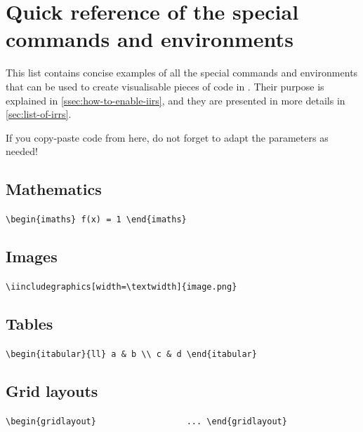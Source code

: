\documentclass[11pt, a4paper]{article}
\begin{document}
\vfill
\tableofcontents
\vfill




\section*{Quick reference of the special commands and environments}
This list contains concise examples of all the special commands and environments that can be used to create visualisable pieces of code in \iLaTeX{}.
Their purpose is explained in \autoref{ssec:how-to-enable-iirs}, and they are presented in more details in \autoref{sec:list-of-irrs}.

If you copy-paste code from here, do not forget to adapt the parameters as needed!

\subsection*{Mathematics}

\hfill
\lstinline[style=custom-latex]|\begin{imaths} f(x) = 1 \end{imaths}|



\subsection*{Images}

\hfill
\lstinline[style=custom-latex]|\iincludegraphics[width=\textwidth]{image.png}|


\subsection*{Tables}

\hfill
\lstinline[style=custom-latex]|\begin{itabular}{ll} a & b \\ c & d \end{itabular}|


\subsection*{Grid layouts}

\hfill
\lstinline[style=custom-latex]|\begin{gridlayout}{\textwidth}{8cm} ... \end{gridlayout}|
\end{document}

